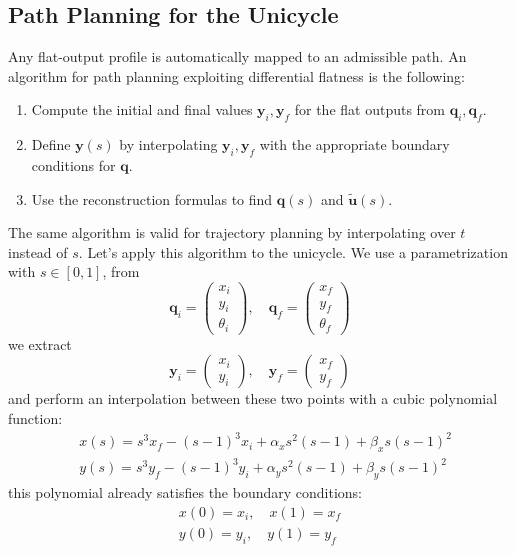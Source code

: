 \documentclass[10pt, a4paper]{report}
\newcommand{\y}{{\mathbf y}}
\newcommand{\q}{{\mathbf q}}
\begin{document}
\subsection{Path Planning for the Unicycle}
Any flat-output profile is automatically mapped to an admissible path. An algorithm for path planning exploiting differential flatness is the following:\begin{enumerate}
    \item Compute the initial and final values $\y_i,\y_f$ for the flat outputs from $\q_i,\q_f$.
    \item Define $\y(s)$ by interpolating $\y_i,\y_f$ with the appropriate boundary conditions for $\q$.
    \item Use the reconstruction formulas to find $\q(s)$ and $\tilde{\mathbf u}(s)$.
\end{enumerate}
The same algorithm is valid for trajectory planning by interpolating over $t$ instead of $s$. Let's apply this algorithm to the unicycle. We use a parametrization with $s\in[0,1]$, from \begin{equation}
    \q_i=\begin{pmatrix}
        x_i\\y_i\\\theta_i
    \end{pmatrix},\quad
    \q_f=\begin{pmatrix}
        x_f\\y_f\\\theta_f
    \end{pmatrix}
\end{equation}
we extract\begin{equation}
    \y_i=\begin{pmatrix}
        x_i\\y_i
    \end{pmatrix},\quad
    \y_f=\begin{pmatrix}
        x_f\\y_f
    \end{pmatrix}
\end{equation}
and perform an interpolation between these two points with a cubic polynomial function:\begin{align}
    &x(s)=s^3x_f-(s-1)^3x_i+\alpha_xs^2(s-1)+\beta_xs(s-1)^2\\ 
    &y(s)=s^3y_f-(s-1)^3y_i+\alpha_ys^2(s-1)+\beta_ys(s-1)^2
\end{align}
this polynomial already satisfies the boundary conditions:\begin{align}
    x(0)=x_i,\quad x(1)=x_f\\ 
    y(0)=y_i,\quad y(1)=y_f
\end{align}
\end{document}
